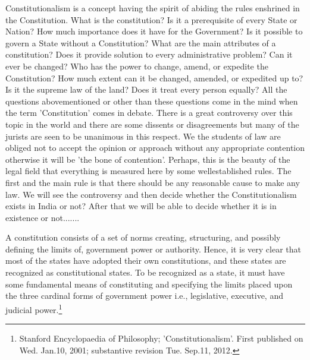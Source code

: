 \setcounter{figure}{0}
\setcounter{table}{0}
\setcounter{footnote}{0}

\label{2018-art4}

\begin{multicols}{2}


\noi
Constitutionalism is a concept having the spirit of abiding the rules enshrined in the Constitution.
What is the constitution? Is it a prerequisite of every State or Nation? How much importance does
it have for the Government? Is it possible to govern a State without a Constitution? What are the
main attributes of a constitution? Does it provide solution to every administrative problem? Can
it ever be changed? Who has the power to change, amend, or expedite the Constitution? How
much extent can it be changed, amended, or expedited up to? Is it the supreme law of the land?
Does it treat every person equally? All the questions abovementioned or other than these questions
come in the mind when the term 'Constitution' comes in debate. There is a great controversy over
this topic in the world and there are some dissents or disagreements but many of the jurists are
seen to be unanimous in this respect. We the students of law are obliged not to accept the opinion
or approach without any appropriate contention otherwise it will be 'the bone of contention'.
Perhaps, this is the beauty of the legal field that everything is measured here by some wellestablished rules. The first and the main rule is that there should be any reasonable cause to make
any law. We will see the controversy and then decide whether the Constitutionalism exists in
India or not? After that we will be able to decide whether it is in existence or not.......


\noi
A constitution consists of a set of norms creating, structuring, and possibly defining the limits of,
government power or authority. Hence, it is very clear that most of the states have adopted their
own constitutions, and these states are recognized as constitutional states. To be recognized as a
state, it must have some fundamental means of constituting and specifying the limits placed upon
the three cardinal forms of government power i.e., legislative, executive, and judicial power.\footnote{Stanford Encyclopaedia of Philosophy; 'Constitutionalism'. First published on Wed. Jan.10, 2001; substantive revision Tue. Sep.11, 2012.}


\end{multicols}
